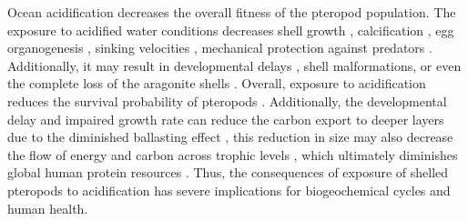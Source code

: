 Ocean acidification decreases the overall fitness of the pteropod population. The exposure to acidified water conditions decreases shell growth \citep{Comeau2010RepairRates,Bednarsek2014CalcificationDissolution}, calcification \citep{Moya2016NervousSystem}, egg organogenesis \citep{Manno2016EggsAcidification}, sinking velocities \citep{Bednarsek2014CalcificationDissolution,Bergan2017SwimmingSinkingSpeeds}, mechanical protection against predators \citep{lalli1989pelagic,Comeau2010Predation}. Additionally, it may result in developmental delays \citep{Thabet2015Lifestages}, shell malformations, or even the complete loss of the aragonite shells \citep{Comeau2010Predation}. Overall, exposure to acidification reduces the survival probability of pteropods \citep{Bednarsek2017ApplicationPteropodShell}. Additionally, the developmental delay and impaired growth rate can reduce the carbon export to deeper layers due to the diminished ballasting effect \citep{Klaas2002Ballast,Bednarsek2014CalcificationDissolution}, this reduction in size may also decrease the flow of energy and carbon across trophic levels \citep{Capuzzo2017AbundanceRecruitment}, which ultimately diminishes global human protein resources \citep{Chassot2010Protein}. Thus, the consequences of exposure of shelled pteropods to acidification has severe implications for biogeochemical cycles and human health. 

